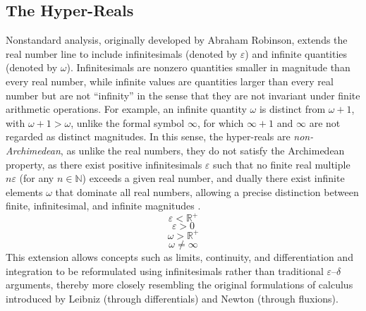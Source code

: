 \documentclass{article}
\begin{document}
\subsection{The Hyper-Reals}
Nonstandard analysis, originally developed by Abraham Robinson, extends the real number line to include infinitesimals (denoted by $\varepsilon$) and infinite quantities (denoted by $\omega$). Infinitesimals are nonzero quantities smaller in magnitude than every real number, while infinite values are quantities larger than every real number but are not ``infinity'' in the sense that they are not invariant under finite arithmetic operations. For example, an infinite quantity $\omega$ is distinct from $\omega + 1$, with $\omega + 1 > \omega$, unlike the formal symbol $\infty$, for which $\infty + 1$ and $\infty$ are not regarded as distinct magnitudes. In this sense, the hyper-reals are \emph{non-Archimedean}, as unlike the real numbers, they do not satisfy the Archimedean property, as there exist positive infinitesimals $\varepsilon$ such that no finite real multiple $n\varepsilon$ (for any $n \in \mathbb{N}$) exceeds a given real number, and dually there exist infinite elements $\omega$ that dominate all real numbers, allowing a precise distinction between finite, infinitesimal, and infinite magnitudes \cite{ponstein}.
$$\varepsilon<\mathbb{R^+}$$ $$\varepsilon>0$$$$\omega>\mathbb{R^+}$$ $$\omega\neq\infty$$This extension allows concepts such as limits, continuity, and differentiation and integration to be reformulated using infinitesimals rather than traditional $\varepsilon$--$\delta$ arguments, thereby more closely resembling the original formulations of calculus introduced by Leibniz (through differentials) and Newton (through fluxions).
\end{document}
